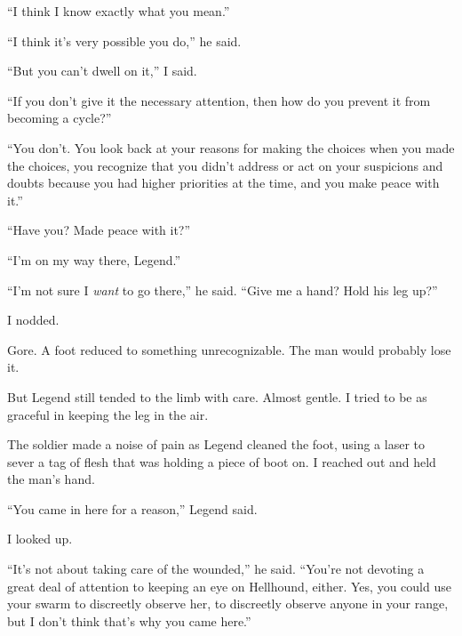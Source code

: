 ``I think I know exactly what you mean.''



``I think it's very possible you do,'' he said.



``But you can't dwell on it,'' I said.



``If you don't give it the necessary attention, then how do you prevent it from becoming a cycle?''



``You don't.  You look back at your reasons for making the choices when you made the choices, you recognize that you didn't address or act on your suspicions and doubts because you had higher priorities at the time, and you make peace with it.''



``Have you?  Made peace with it?''



``I'm on my way there, Legend.''



``I'm not sure I \emph{want} to go there,'' he said.  ``Give me a hand?  Hold his leg up?''



I nodded.



Gore.  A foot reduced to something unrecognizable.  The man would probably lose it.



But Legend still tended to the limb with care.  Almost gentle.  I tried to be as graceful in keeping the leg in the air.



The soldier made a noise of pain as Legend cleaned the foot, using a laser to sever a tag of flesh that was holding a piece of boot on.  I reached out and held the man's hand.



``You came in here for a reason,'' Legend said.



I looked up.



``It's not about taking care of the wounded,'' he said.  ``You're not devoting a great deal of attention to keeping an eye on Hellhound, either.  Yes, you could use your swarm to discreetly observe her, to discreetly observe anyone in your range, but I don't think that's why you came here.''



